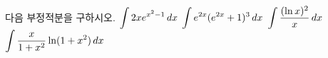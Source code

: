 다음 부정적분을 구하시오.
 $\displaystyle\int 2xe^{x^2-1}\mkern3mu dx$
 $\displaystyle\int e^{2x}(e^{2x}+1)^3\mkern3mu dx$
 $\displaystyle\int\dfrac{(\ln x)^2}{x}\mkern3mu dx$
 $\displaystyle\int\dfrac{x}{1+x^2}\ln(1+x^2)\mkern3mu dx$
